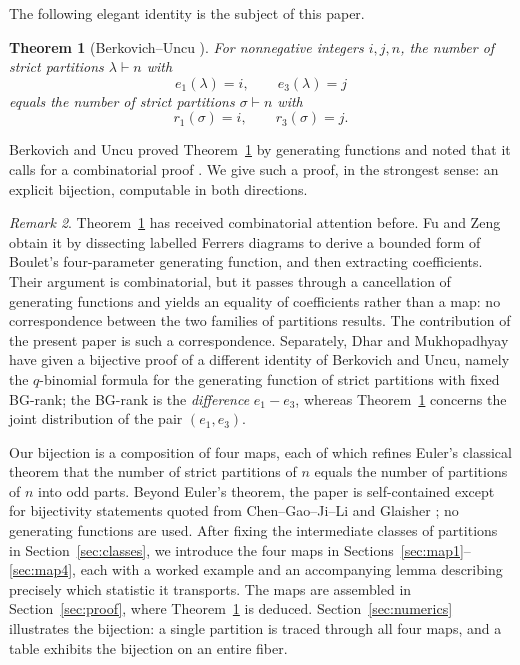 \documentclass[11pt]{amsart}
\newtheorem{theorem}{Theorem}[section]
\theoremstyle{definition}
\theoremstyle{remark}
\newtheorem{remark}[theorem]{Remark}
\begin{document}
The following elegant identity is the subject of this paper.

\begin{theorem}[Berkovich--Uncu {\cite[Theorem 1.1]{BU}}]\label{thm:BU}
For nonnegative integers \(i,j,n\), the number of strict partitions \(\lambda\vdash n\)
with
\[
   e_1(\lambda)=i,\qquad e_3(\lambda)=j
\]
equals the number of strict partitions \(\sigma\vdash n\) with
\[
   r_1(\sigma)=i,\qquad r_3(\sigma)=j.
\]
\end{theorem}

Berkovich and Uncu proved Theorem~\ref{thm:BU} by generating functions and noted
that it calls for a combinatorial proof \cite[Section 7]{BU}. We give such a proof, in the strongest sense: an explicit bijection, computable in both directions.

\begin{remark}\label{rem:FZ}
Theorem~\ref{thm:BU} has received combinatorial attention before. Fu and Zeng \cite[Theorem 1.2 and Section 4.1]{FZ} obtain it by dissecting labelled Ferrers diagrams to derive a bounded form of Boulet's four-parameter generating function, and then extracting coefficients. Their argument is combinatorial, but it passes through a cancellation of generating functions and yields an equality of coefficients rather than a map: no correspondence between the two families of partitions results. The contribution of the present paper is such a correspondence. Separately, Dhar and Mukhopadhyay \cite{DM} have given a bijective proof of a different identity of Berkovich and Uncu, namely the $q$-binomial formula \cite[Theorem 3.1]{BU} for the generating function of strict partitions with fixed BG-rank; the BG-rank is the \emph{difference} $e_1-e_3$, whereas Theorem~\ref{thm:BU} concerns the joint distribution of the pair $(e_1,e_3)$.
\end{remark}

Our bijection is a composition of four maps, each of which refines Euler's classical theorem that the number of strict partitions of $n$ equals the number of partitions of $n$ into odd parts. Beyond Euler's theorem, the paper is self-contained except for bijectivity statements quoted from Chen--Gao--Ji--Li \cite{CGJL} and Glaisher \cite{Glaisher}; no generating functions are used. After fixing the intermediate classes of partitions in
Section~\ref{sec:classes}, we introduce the four maps in Sections~\ref{sec:map1}--\ref{sec:map4},
each with a worked example and an accompanying lemma describing precisely which statistic it transports.
The maps are assembled in Section~\ref{sec:proof}, where Theorem~\ref{thm:BU} is
deduced. Section~\ref{sec:numerics} illustrates the bijection: a single partition is traced through all four maps, and a table exhibits the bijection on an entire fiber.
\end{document}
